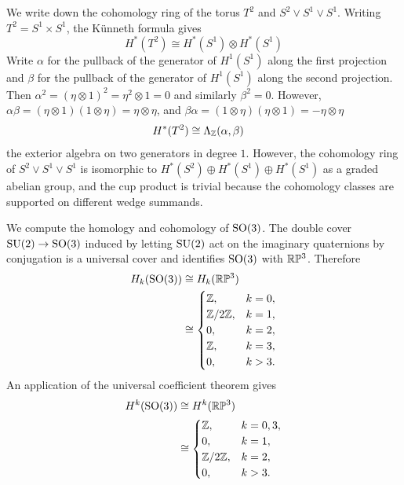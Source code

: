 \documentclass[12pt]{article}
\begin{document}
\begin{example}
    We write down the cohomology ring of the torus $T^2$ and $S^2 \vee S^1 \vee S^1$. Writing $T^2 = S^1 \times S^1$, the K\"unneth formula gives
\[H^*(T^2) \cong H^*(S^1) \otimes H^*(S^1)\]
Write $\alpha$ for the pullback of the generator of $H^1(S^1)$ along the first projection and $\beta$ for the pullback of the generator of $H^1(S^1)$ along the second projection. Then $\alpha^2=(\eta\otimes 1)^2=\eta^2\otimes 1=0$ and similarly $\beta^2=0$. However, $\alpha\beta = (\eta\otimes 1)(1\otimes \eta) = \eta\otimes \eta$, and $\beta\alpha = (1\otimes \eta)(\eta\otimes 1) = -\eta\otimes \eta$
\begin{align*}
    H^*(T^2) & \cong \Lambda_{\mathbb{Z}}(\alpha,\beta)
\end{align*} the exterior algebra on two generators in degree $1$. However, the cohomology ring of $S^2 \vee S^1 \vee S^1$ is isomorphic to $H^*(S^2) \oplus H^*(S^1) \oplus H^*(S^1)$ as a graded abelian group, and the cup product is trivial because the cohomology classes are supported on different wedge summands. 
\end{example}

\begin{example}
    We compute the homology and cohomology of $\operatorname{SO}(3)$.
    The double cover $\operatorname{SU}(2) \to \operatorname{SO}(3)$ induced by letting $\operatorname{SU}(2)$ act on the imaginary quaternions by conjugation is a universal cover and identifies $\operatorname{SO}(3)$ with $\mathbb{R}\mathbb{P}^3$. Therefore \begin{align*}
        H_k(\operatorname{SO}(3)) & \cong H_k(\mathbb{R}\mathbb{P}^3) \\
        & \cong
        \begin{cases}
        \mathbb{Z}, & k=0,\\
        \mathbb{Z}/2\mathbb{Z}, & k=1,\\
        0, & k=2,\\
        \mathbb{Z}, & k=3,\\
        0, & k>3.
        \end{cases}
    \end{align*}
    An application of the universal coefficient theorem gives
    \begin{align*}
        H^k(\operatorname{SO}(3)) & \cong H^k(\mathbb{R}\mathbb{P}^3) \\
        & \cong
        \begin{cases}
        \mathbb{Z}, & k=0,3,\\
        0, & k=1,\\
        \mathbb{Z}/2\mathbb{Z}, & k=2,\\
        0, & k>3.
        \end{cases}
    \end{align*}
\end{example}
\end{document}
